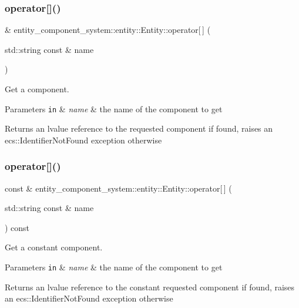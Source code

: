 \subsubsection{operator[]()\hspace{0.1cm}{\footnotesize\ttfamily [1/2]}}
{\footnotesize{} \& entity\+\_\+component\+\_\+system\+::entity\+::\+Entity\+::operator[$\,$] (\begin{DoxyParamCaption}\item[{std\+::string const \&}]{name }\end{DoxyParamCaption})}



Get a component. 


\begin{DoxyParams}[1]{Parameters}
\mbox{\tt in}  & {\em name} & the name of the component to get \\
\hline
\end{DoxyParams}
\begin{DoxyReturn}{Returns}
an lvalue reference to the requested component if found, raises an ecs\+::\+Identifier\+Not\+Found exception otherwise 
\end{DoxyReturn}
\label{classentity__component__system_1_1entity_1_1_entity_a57cfa49d47f456408c557b29b28be76f} 
\subsubsection{operator[]()\hspace{0.1cm}{\footnotesize\ttfamily [2/2]}}
{\footnotesize{} const  \& entity\+\_\+component\+\_\+system\+::entity\+::\+Entity\+::operator[$\,$] (\begin{DoxyParamCaption}\item[{std\+::string const \&}]{name }\end{DoxyParamCaption}) const}



Get a constant component. 


\begin{DoxyParams}[1]{Parameters}
\mbox{\tt in}  & {\em name} & the name of the component to get \\
\hline
\end{DoxyParams}
\begin{DoxyReturn}{Returns}
an lvalue reference to the constant requested component if found, raises an ecs\+::\+Identifier\+Not\+Found exception otherwise 
\end{DoxyReturn}
\label{classentity__component__system_1_1entity_1_1_entity_a9709541ddf8c1fef7c1304ca04198052} 
